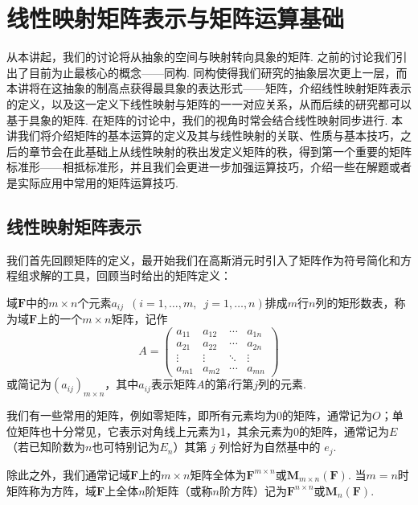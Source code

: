 \chapter{线性映射矩阵表示与矩阵运算基础} \label{chap:线性映射矩阵表示}

从本讲起，我们的讨论将从抽象的空间与映射转向具象的矩阵. 之前的讨论我们引出了目前为止最核心的概念——同构. 同构使得我们研究的抽象层次更上一层，而本讲将在这抽象的制高点获得最具象的表达形式——矩阵，介绍线性映射矩阵表示的定义，以及这一定义下线性映射与矩阵的一一对应关系，从而后续的研究都可以基于具象的矩阵. 在矩阵的讨论中，我们的视角时常会结合线性映射同步进行. 本讲我们将介绍矩阵的基本运算的定义及其与线性映射的关联、性质与基本技巧，之后的章节会在此基础上从线性映射的秩出发定义矩阵的秩，得到第一个重要的矩阵标准形——相抵标准形，并且我们会更进一步加强运算技巧，介绍一些在解题或者是实际应用中常用的矩阵运算技巧.

\section{线性映射矩阵表示}

我们首先回顾矩阵的定义，最开始我们在高斯消元时引入了矩阵作为符号简化和方程组求解的工具，回顾当时给出的矩阵定义：

\begin{definition}{}{}
    域$\mathbf{F}$中的$m\times n$个元素$a_{ij}\enspace(i=1,\ldots,m,\enspace j=1,\ldots,n)$排成$m$行$n$列的矩形数表，称为域$\mathbf{F}$上的一个$m\times n$矩阵，记作
    \[A=\begin{pmatrix}
            a_{11} & a_{12} & \cdots & a_{1n} \\
            a_{21} & a_{22} & \cdots & a_{2n} \\
            \vdots & \vdots & \ddots & \vdots \\
            a_{m1} & a_{m2} & \cdots & a_{mn}
        \end{pmatrix}\]
    或简记为$(a_{ij})_{m\times n}$，其中$a_{ij}$表示矩阵$A$的第$i$行第$j$列的元素.
\end{definition}

我们有一些常用的矩阵，例如零矩阵，即所有元素均为0的矩阵，通常记为$O$；单位矩阵也十分常见，它表示对角线上元素为1，其余元素为0的矩阵，通常记为$E$（若已知阶数为$n$也可特别记为$E_n$）其第 $j$ 列恰好为自然基中的 $e_j$.

除此之外，我们通常记域$\mathbf{F}$上的$m\times n$矩阵全体为$\mathbf{F}^{m\times n}$或$\mathbf{M}_{m\times n}(\mathbf{F})$. 当$m=n$时矩阵称为方阵，域$\mathbf{F}$上全体$n$阶矩阵（或称$n$阶方阵）记为$\mathbf{F}^{n\times n}$或$\mathbf{M}_n(\mathbf{F})$.

